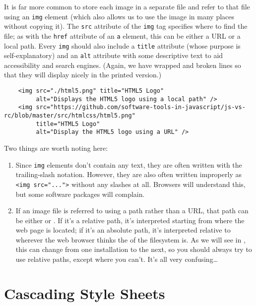 It is far more common to store each image in a separate file
and refer to that file using an \texttt{img} element
(which also allows us to use the image in many places without copying it).
The \texttt{src} attribute of the \texttt{img} tag specifies where to find the file;
as with the \texttt{href} attribute of an \texttt{a} element,
this can be either a URL or a local path.
Every \texttt{img} should also include a \texttt{title} attribute (whose purpose is self-explanatory)
and an \texttt{alt} attribute with some descriptive text to aid accessibility and search engines.
(Again, we have wrapped and broken lines so that they will display nicely in the printed version.)

\begin{verbatim}
    <img src="./html5.png" title="HTML5 Logo"
         alt="Displays the HTML5 logo using a local path" />
    <img src="https://github.com/software-tools-in-javascript/js-vs-rc/blob/master/src/htmlcss/html5.png"
         title="HTML5 Logo"
         alt="Display the HTML5 logo using a URL" />
\end{verbatim}

Two things are worth noting here:

\begin{enumerate}
\item
  Since \texttt{img} elements don't contain any text,
  they are often written with the trailing-slash notation.
  However,
  they are also often written improperly as \texttt{{\textless}img\ src="..."{\textgreater}} without any slashes at all.
  Browsers will understand this,
  but some software packages will complain.
\item
  If an image file is referred to using a path rather than a URL,
  that path can be either  or .
  If it's a relative path,
  it's interpreted starting from where the web page is located;
  if it's an absolute path,
  it's interpreted relative to wherever the web browser thinks the  of the filesystem is.
  As we will see in ,
  this can change from one installation to the next,
  so you should always try to use relative paths,
  except where you can't.
  It's all very confusing\ldots{}
\end{enumerate}

\section{Cascading Style Sheets}\label{s:htmlcss-css}

